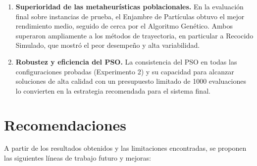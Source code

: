 \documentclass[letterpaper, 12pt]{report}
\begin{document}
\begin{enumerate}
    \item \textbf{Superioridad de las metaheurísticas poblacionales.}
    En la evaluación final sobre instancias de prueba, el Enjambre de Partículas obtuvo el mejor rendimiento medio, seguido de cerca por el Algoritmo Genético. Ambos superaron ampliamente a los métodos de trayectoria, en particular a Recocido Simulado, que mostró el peor desempeño y alta variabilidad.
    
    \item \textbf{Robustez y eficiencia del PSO.}
    La consistencia del PSO en todas las configuraciones probadas (Experimento 2) y su capacidad para alcanzar soluciones de alta calidad con un presupuesto limitado de 1000 evaluaciones lo convierten en la estrategia recomendada para el sistema final.
\end{enumerate}

    \chapter{Recomendaciones}

A partir de los resultados obtenidos y las limitaciones encontradas, se proponen las siguientes líneas de trabajo futuro y mejoras:
\end{document}
